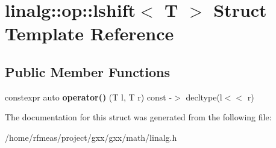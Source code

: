 \hypertarget{structlinalg_1_1op_1_1lshift}{}\section{linalg\+:\+:op\+:\+:lshift$<$ T $>$ Struct Template Reference}
\label{structlinalg_1_1op_1_1lshift}
\subsection*{Public Member Functions}
\begin{DoxyCompactItemize}
\item 
constexpr auto {\bfseries operator()} (T l, T r) const -\/$>$ decltype(l$<$$<$ r)\hypertarget{structlinalg_1_1op_1_1lshift_a9e5ce25d77c9262b449a62a214635687}{}\label{structlinalg_1_1op_1_1lshift_a9e5ce25d77c9262b449a62a214635687}

\end{DoxyCompactItemize}


The documentation for this struct was generated from the following file\+:\begin{DoxyCompactItemize}
\item 
/home/rfmeas/project/gxx/gxx/math/linalg.\+h\end{DoxyCompactItemize}
